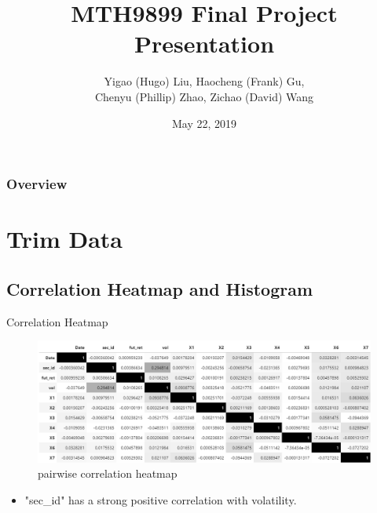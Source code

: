 \documentclass{beamer}
\title[Short title]{MTH9899 Final Project Presentation} %
\author{Yigao (Hugo) Liu, Haocheng (Frank) Gu,\\
        Chenyu (Phillip) Zhao, Zichao (David) Wang} %
\institute[UC Riverside] %
{
Baruch College, CUNY \\ %
\medskip
}
\date{May 22, 2019} %
\begin{document}
\begin{frame}
\titlepage %
\end{frame}

\begin{frame}
\frametitle{Overview} %
\tableofcontents %
\end{frame}



\section{Trim Data}
\subsection{Correlation Heatmap and Histogram}
\begin{frame}{Correlation Heatmap}
\begin{figure}[ht]
\centering
\includegraphics[scale=0.55]{corr_heatmap.PNG}
\caption{pairwise correlation heatmap}
\label{fig:label}
\end{figure}

\begin{itemize}
    \item "sec\_id" has a strong positive correlation with volatility.
\end{itemize}
\end{frame}
\end{document}
